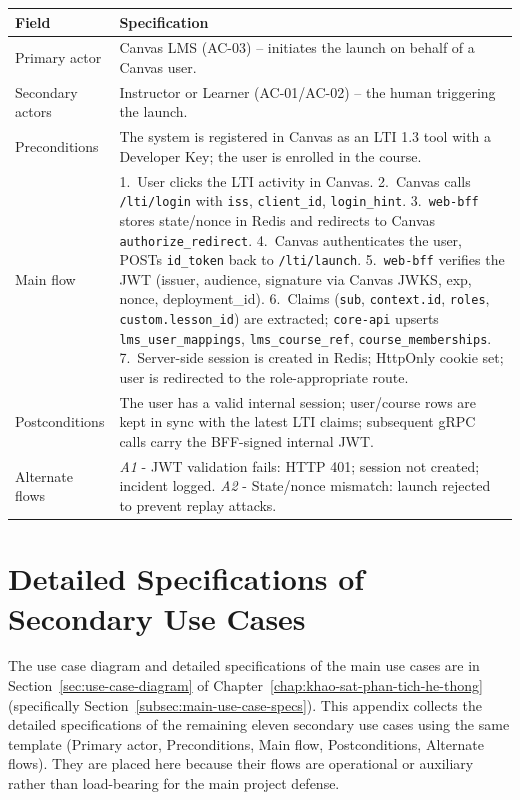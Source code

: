 \begin{longtable}{|p{3.2cm}|p{10.3cm}|}
\hline
\textbf{Field} & \textbf{Specification} \\
\hline
\endhead
Primary actor & Canvas LMS (AC-03) -- initiates the launch on behalf
    of a Canvas user. \\
\hline
Secondary actors & Instructor or Learner (AC-01/AC-02) -- the human
    triggering the launch. \\
\hline
Preconditions & The system is registered in Canvas as an LTI 1.3 tool
    with a Developer Key; the user is enrolled in the course. \\
\hline
Main flow &
    1.\ User clicks the LTI activity in Canvas.
    2.\ Canvas calls \texttt{/lti/login} with
    \texttt{iss}, \texttt{client\_id}, \texttt{login\_hint}.
    3.\ \texttt{web-bff} stores state/nonce in Redis and redirects to
    Canvas \texttt{authorize\_redirect}.
    4.\ Canvas authenticates the user, POSTs \texttt{id\_token} back
    to \texttt{/lti/launch}.
    5.\ \texttt{web-bff} verifies the JWT (issuer, audience, signature
    via Canvas JWKS, exp, nonce, deployment\_id).
    6.\ Claims (\texttt{sub}, \texttt{context.id}, \texttt{roles},
    \texttt{custom.lesson\_id}) are extracted; \texttt{core-api}
    upserts \texttt{lms\_user\_mappings},
    \texttt{lms\_course\_ref}, \texttt{course\_memberships}.
    7.\ Server-side session is created in Redis; HttpOnly cookie set;
    user is redirected to the role-appropriate route. \\
\hline
Postconditions & The user has a valid internal session; user/course
    rows are kept in sync with the latest LTI claims; subsequent gRPC
    calls carry the BFF-signed internal JWT. \\
\hline
Alternate flows &
    \emph{A1} - JWT validation fails: HTTP 401; session not created;
    incident logged.
    \emph{A2} - State/nonce mismatch: launch rejected to prevent
    replay attacks. \\
\hline
\end{longtable}

\section{Detailed Specifications of Secondary Use Cases}
\label{appendix:use-case-reference}

The use case diagram and detailed specifications of the main use cases
are in
Section~\ref{sec:use-case-diagram} of
Chapter~\ref{chap:khao-sat-phan-tich-he-thong} (specifically
Section~\ref{subsec:main-use-case-specs}). This appendix collects the
detailed specifications of the remaining eleven secondary use cases
using the same template (Primary actor, Preconditions, Main flow,
Postconditions, Alternate flows). They are placed here because their
flows are operational or auxiliary rather than load-bearing for the
main project defense.


